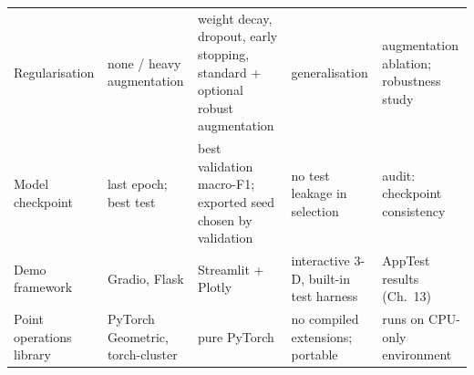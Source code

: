 \begin{longtable}{L{2.0cm}L{3.2cm}L{2.6cm}L{3.4cm}L{3.0cm}}
Regularisation & none / heavy augmentation & weight decay, dropout, early stopping, standard + optional robust augmentation & generalisation & augmentation ablation; robustness study \\
Model checkpoint & last epoch; best test & best validation macro-F1; exported seed chosen by validation & no test leakage in selection & audit: checkpoint consistency \\
Demo framework & Gradio, Flask & Streamlit + Plotly & interactive 3-D, built-in test harness & AppTest results (Ch.~13) \\
Point operations library & PyTorch Geometric, torch-cluster & pure PyTorch & no compiled extensions; portable & runs on CPU-only environment \\
\bottomrule
\end{longtable}
